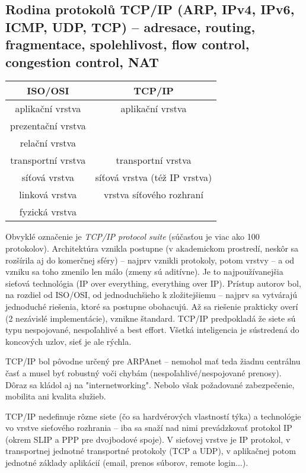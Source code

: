 \subsection{Rodina protokolů TCP/IP (ARP, IPv4, IPv6, ICMP, UDP, TCP) -- adresace, routing, fragmentace, spolehlivost, flow control, congestion control, NAT}
\begin{center}
\begin{tabular}{|c|c|}
	\hline
	ISO/OSI & TCP/IP \\
	\hline
	\hline
	aplikační vrstva & aplikační vrstva\\
	prezentační vrstva &\\
	relační vrstva &\\
	\hline
	transportní vrstva & transportní vrstva \\
	\hline
	síťová vrstva & síťová vrstva (též IP vrstva) \\
	\hline
	linková vrstva & vrstva síťového rozhraní\\
	fyzická vrstva & \\
	\hline
\end{tabular}
\end{center}

Obvyklé označenie je \emph{TCP/IP protocol suite} (súčasťou je viac ako 100 protokolov). Architektúra vznikla postupne (v akademickom prostredí, neskôr sa rozšírila aj do komerčnej sféry) -- najprv vznikli protokoly, potom vrstvy -- a od vzniku sa toho zmenilo len málo (zmeny sú aditívne). Je to najpoužívanejšia sieťová technológia (IP over everything, everything over IP). Prístup autorov bol, na rozdiel od ISO/OSI, od jednoduchšieho k zložitejšiemu -- najprv sa vytvárajú jednoduché riešenia, ktoré sa postupne obohacujú. Až sa riešenie prakticky overí (2 nezávislé implementácie), vznikne štandard. TCP/IP predpokladá že siete sú typu nespojované, nespoľahlivé a best effort. Všetká inteligencia je sústredená do koncových uzlov, sieť je  ale rýchla.

TCP/IP bol pôvodne určený pre ARPAnet -- nemohol mať teda žiadnu centrálnu časť a musel byť robustný voči chybám (nespoľahlivé/nespojované prenosy). Dôraz sa kládol aj na "internetworking". Nebolo však požadované zabezpečenie, mobilita ani kvalita služieb.

TCP/IP nedefinuje rôzne siete (čo sa hardvérových vlastností týka) a technológie vo vrstve sieťového rozhrania -- iba sa snaží nad nimi prevádzkovať protokol IP (okrem SLIP a PPP pre dvojbodové spoje). V sieťovej vrstve je IP protokol, v transportnej jednotné transportné protokoly (TCP a UDP), v aplikačnej potom jednotné základy aplikácií (email, prenos súborov, remote login...).

